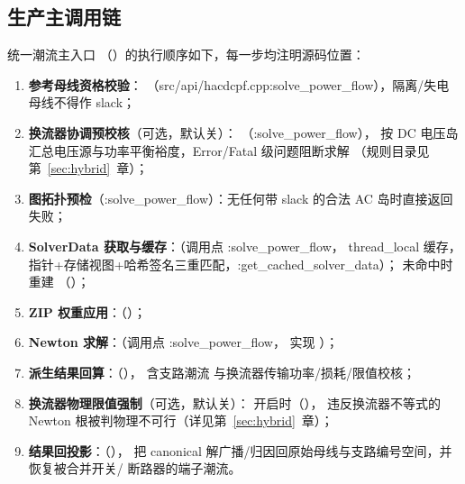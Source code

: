 \subsection{生产主调用链}
统一潮流主入口 
（）的执行顺序如下，每一步均注明源码位置：

\begin{enumerate}
  \item \textbf{参考母线资格校验}：
        （src/api/hacdcpf.cpp:solve\_power\_flow），隔离/失电母线不得作 slack；
  \item \textbf{换流器协调预校核}（可选，默认关）：
        （:solve\_power\_flow），
        按 DC 电压岛汇总电压源与功率平衡裕度，Error/Fatal 级问题阻断求解
        （规则目录见第~\ref{sec:hybrid}~章）；
  \item \textbf{图拓扑预检}（:solve\_power\_flow）：无任何带 slack 的合法 AC 岛时直接返回失败；
  \item \textbf{SolverData 获取与缓存}：（调用点 :solve\_power\_flow，
        thread\_local 缓存，指针+存储视图+哈希签名三重匹配，:get\_cached\_solver\_data）；
        未命中时  重建
        （）；
  \item \textbf{ZIP 权重应用}：（）；
  \item \textbf{Newton 求解}：（调用点 :solve\_power\_flow，
        实现 ）；
  \item \textbf{派生结果回算}：（），
        含支路潮流  与换流器传输功率/损耗/限值校核；
  \item \textbf{换流器物理限值强制}（可选，默认关）：
         开启时（），
        违反换流器不等式的 Newton 根被判物理不可行（详见第~\ref{sec:hybrid}~章）；
  \item \textbf{结果回投影}：（），
        把 canonical 解广播/归因回原始母线与支路编号空间，并恢复被合并开关/
        断路器的端子潮流。
\end{enumerate}


